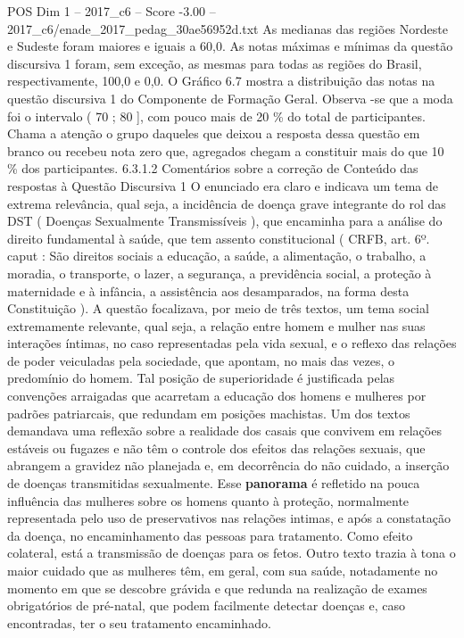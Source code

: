 \begin{textsample}{POS Dim 1 – 2017\_c6 – Score -3.00 – 2017\_c6/enade\_2017\_pedag\_30ae56952d.txt}
As medianas das regiões Nordeste e Sudeste foram maiores e iguais a 60,0.
As notas máximas e mínimas da questão discursiva 1 foram, sem exceção, as mesmas para todas as regiões do Brasil, respectivamente, 100,0 e 0,0.
O Gráfico 6.7 mostra a distribuição das notas na questão discursiva 1 do Componente de Formação Geral.
Observa -se que a moda foi o intervalo ( 70 ; 80 ], com pouco mais de 20 \% do total de participantes.
Chama a atenção o grupo daqueles que deixou a resposta dessa questão em branco ou recebeu nota zero que, agregados chegam a constituir mais do que 10 \% dos participantes. 6.3.1.2 Comentários sobre a correção de Conteúdo das respostas à Questão Discursiva 1 O enunciado era claro e indicava um tema de extrema relevância, qual seja, a incidência de doença grave integrante do rol das DST ( Doenças Sexualmente Transmissíveis ), que encaminha para a análise do direito fundamental à saúde, que tem assento constitucional ( CRFB, art. 6º. caput : São direitos sociais a educação, a saúde, a alimentação, o trabalho, a moradia, o transporte, o lazer, a segurança, a previdência social, a proteção à maternidade e à infância, a assistência aos desamparados, na forma desta Constituição ).
A questão focalizava, por meio de três textos, um tema social extremamente relevante, qual seja, a relação entre homem e mulher nas suas interações íntimas, no caso representadas pela vida sexual, e o reflexo das relações de poder veiculadas pela sociedade, que apontam, no mais das vezes, o predomínio do homem.
Tal posição de superioridade é justificada pelas convenções arraigadas que acarretam a educação dos homens e mulheres por padrões patriarcais, que redundam em posições machistas.
Um dos textos demandava uma reflexão sobre a realidade dos casais que convivem em relações estáveis ou fugazes e não têm o controle dos efeitos das relações sexuais, que abrangem a gravidez não planejada e, em decorrência do não cuidado, a inserção de doenças transmitidas sexualmente.
Esse \textbf{panorama} é refletido na pouca influência das mulheres sobre os homens quanto à proteção, normalmente representada pelo uso de preservativos nas relações intimas, e após a constatação da doença, no encaminhamento das pessoas para tratamento.
Como efeito colateral, está a transmissão de doenças para os fetos.
Outro texto trazia à tona o maior cuidado que as mulheres têm, em geral, com sua saúde, notadamente no momento em que se descobre grávida e que redunda na realização de exames obrigatórios de pré-natal, que podem facilmente detectar doenças e, caso encontradas, ter o seu tratamento encaminhado.

\end{textsample}
